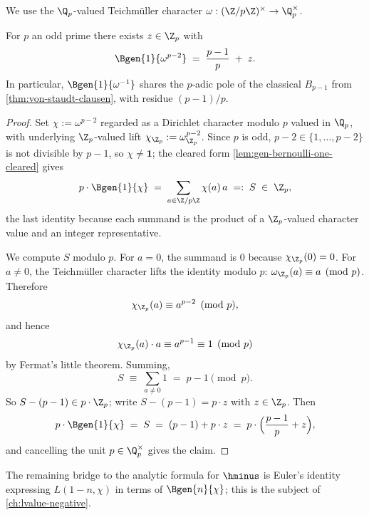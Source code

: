 We use the $\Q_p$-valued Teichm\"uller character
\(\omega : (\Z/p\Z)^\times \to \Q_p^\times\).

\begin{theorem}
  \label{thm:boundary-character-bernoulli}
  \leanok
For $p$ an odd prime there exists $z \in \Z_p$ with
\[
  \Bgen{1}{\omega^{p-2}} \;=\; \frac{p - 1}{p} \;+\; z.
\]
In particular, $\Bgen{1}{\omega^{-1}}$ shares the $p$-adic pole of the
classical $B_{p-1}$ from \cref{thm:von-staudt-clausen}, with residue
$(p - 1)/p$.
\end{theorem}

\begin{proof}\leanok
Set $\chi := \omega^{p - 2}$ regarded as a Dirichlet character modulo
$p$ valued in $\Q_p$, with underlying $\Z_p$-valued lift
$\chi_{\Z_p} := \omega_{\Z_p}^{p - 2}$. Since $p$ is odd, $p - 2 \in
\{1, \dots, p - 2\}$ is not divisible by $p - 1$, so $\chi \ne
\mathbf{1}$; the cleared form
\cref{lem:gen-bernoulli-one-cleared} gives
\[
  p \cdot \Bgen{1}{\chi}
  \;=\; \sum_{a \in \Z/p\Z} \chi(a)\,a
  \;=:\; S \;\in\; \Z_p,
\]
the last identity because each summand is the product of a
$\Z_p$-valued character value and an integer representative.

We compute $S$ modulo $p$. For $a = 0$, the summand is $0$ because
$\chi_{\Z_p}(0) = 0$. For $a \ne 0$, the Teichm\"uller character lifts
the identity modulo $p$: $\omega_{\Z_p}(a) \equiv a \pmod{p}$. Therefore
\[
  \chi_{\Z_p}(a) \equiv a^{p - 2} \pmod{p},
\]
and hence
\[
  \chi_{\Z_p}(a) \cdot a \equiv a^{p - 1} \equiv 1 \pmod{p}
\]
by Fermat's little theorem.
Summing,
\[
  S \;\equiv\; \sum_{a \ne 0} 1 \;=\; p - 1 \pmod{p}.
\]
So $S - (p - 1) \in p \cdot \Z_p$; write $S - (p - 1) = p \cdot z$
with $z \in \Z_p$. Then
\[
  p \cdot \Bgen{1}{\chi} \;=\; S \;=\; (p - 1) + p \cdot z
  \;=\; p \cdot \Bigl(\frac{p - 1}{p} + z\Bigr),
\]
and cancelling the unit $p \in \Q_p^{\times}$ gives the claim.
\end{proof}

The remaining bridge to the analytic formula for $\hminus$ is Euler's
identity expressing $L(1 - n, \chi)$ in terms of $\Bgen{n}{\chi}$;
this is the subject of \cref{ch:lvalue-negative}.
